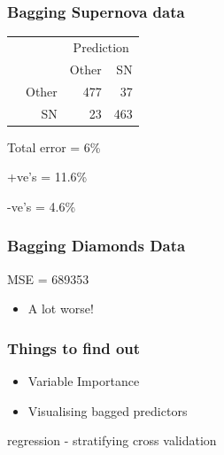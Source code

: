 \documentclass{beamer}
\begin{document}
\begin{frame}
	\frametitle{Bagging Supernova data}
	\begin{table}
	\begin{tabular}{cr|rr}
	& & \multicolumn{2}{c}{Prediction}\\
	& & Other & SN\\
	\hline
	\multirow{2}{*}{\rotatebox{90}{Actual}} & Other &  477 &  37\\
	& SN & 23 &  463\\
	\end{tabular}
	\end{table}
		Total error = 6\%
		
		+ve's = 11.6\%
		
		-ve's = 4.6\%
\end{frame}

\begin{frame}
	\frametitle{Bagging Diamonds Data}
	MSE = 689353
 	\begin{itemize}
 		\item A lot worse!

 	\end{itemize}
	
	\end{frame}


\begin{frame}
	\frametitle{Things to find out}
	\begin{itemize}
		\item Variable Importance
		\item Visualising bagged predictors
	\end{itemize}	
\end{frame}

regression
	- stratifying cross validation

\nocite{546466}
\nocite{rpart}
\nocite{cart84}

\frame{
\begin{tiny}


\end{tiny}
}


\end{document}
